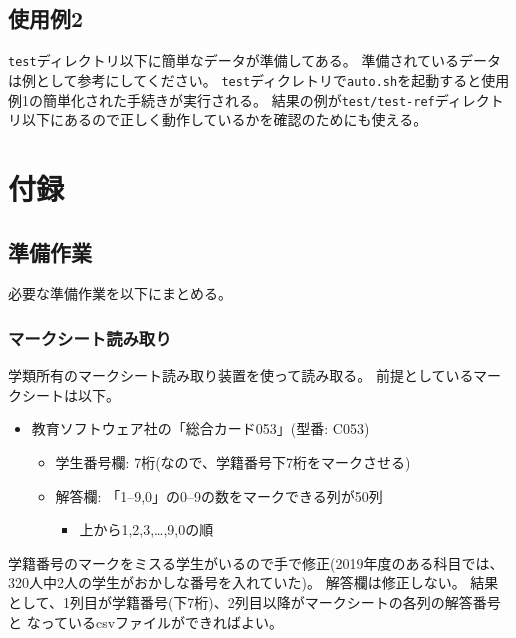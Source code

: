 \subsection{使用例2}
\label{使用例2}

\texttt{test}ディレクトリ以下に簡単なデータが準備してある。
準備されているデータは例として参考にしてください。
\texttt{test}ディクレトリで\texttt{auto.sh}を起動すると使用例1の簡単化された手続きが実行される。
結果の例が\texttt{test\slash test-ref}ディレクトリ以下にあるので正しく動作しているかを確認のためにも使える。

\section{付録}
\label{付録}

\subsection{準備作業}
\label{準備作業}

必要な準備作業を以下にまとめる。

\subsubsection{マークシート読み取り}
\label{マークシート読み取り}

学類所有のマークシート読み取り装置を使って読み取る。
前提としているマークシートは以下。

\begin{itemize}
\item 教育ソフトウェア社の「総合カード053」(型番: C053)

\begin{itemize}
\item 学生番号欄: 7桁(なので、学籍番号下7桁をマークさせる)

\item 解答欄: 「1--9,0」の0--9の数をマークできる列が50列

\begin{itemize}
\item 上から1,2,3,{\ldots},9,0の順

\end{itemize}

\end{itemize}

\end{itemize}
学籍番号のマークをミスる学生がいるので手で修正(2019年度のある科目では、
320人中2人の学生がおかしな番号を入れていた)。
解答欄は修正しない。
結果として、1列目が学籍番号(下7桁)、2列目以降がマークシートの各列の解答番号と
なっているcsvファイルができればよい。

